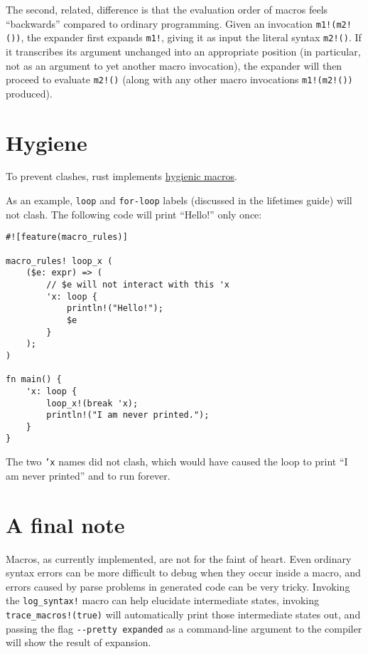 \documentclass[]{article}
\begin{document}
The second, related, difference is that the evaluation order of macros
feels ``backwards'' compared to ordinary programming. Given an
invocation \texttt{m1!(m2!())}, the expander first expands \texttt{m1!},
giving it as input the literal syntax \texttt{m2!()}. If it transcribes
its argument unchanged into an appropriate position (in particular, not
as an argument to yet another macro invocation), the expander will then
proceed to evaluate \texttt{m2!()} (along with any other macro
invocations \texttt{m1!(m2!())} produced).

\section{Hygiene}\label{hygiene}

To prevent clashes, rust implements
\href{http://en.wikipedia.org/wiki/Hygienic_macro}{hygienic macros}.

As an example, \texttt{loop} and \texttt{for-loop} labels (discussed in
the lifetimes guide) will not clash. The following code will print
``Hello!'' only once:

\begin{verbatim}
#![feature(macro_rules)]

macro_rules! loop_x (
    ($e: expr) => (
        // $e will not interact with this 'x
        'x: loop {
            println!("Hello!");
            $e
        }
    );
)

fn main() {
    'x: loop {
        loop_x!(break 'x);
        println!("I am never printed.");
    }
}
\end{verbatim}

The two \texttt{'x} names did not clash, which would have caused the
loop to print ``I am never printed'' and to run forever.

\section{A final note}\label{a-final-note}

Macros, as currently implemented, are not for the faint of heart. Even
ordinary syntax errors can be more difficult to debug when they occur
inside a macro, and errors caused by parse problems in generated code
can be very tricky. Invoking the \texttt{log\_syntax!} macro can help
elucidate intermediate states, invoking \texttt{trace\_macros!(true)}
will automatically print those intermediate states out, and passing the
flag \texttt{-\/-pretty expanded} as a command-line argument to the
compiler will show the result of expansion.
\end{document}
